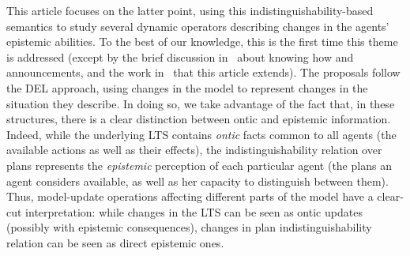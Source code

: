 %
%
%



This article focuses on the latter point, using this in\-dis\-tin\-guisha\-bil\-i\-ty-based semantics to study several dynamic operators describing changes in the agents' epistemic abilities. To the best of our knowledge, this is the first time this theme is addressed (except by the brief discussion in~\cite{Wang2016} about knowing how and announcements, and the work in~\cite{AFSV22} that this article extends). The proposals follow the DEL approach, using changes in the model to represent changes in the situation they describe. In doing so, we take advantage of the fact that, in these structures, there is a clear distinction between ontic and epistemic information. Indeed, while the underlying LTS contains \emph{ontic} facts common to all agents (the available actions as well as their effects), the indistinguishability relation over plans represents the \emph{epistemic} perception of each particular agent (the plans an agent considers available, as well as her capacity to distinguish between them). Thus, model-update operations affecting different parts of the model have a clear-cut interpretation: while changes in the LTS can be seen as ontic updates (possibly with epistemic consequences), changes in plan indistinguishability relation can be seen as direct epistemic ones. 


